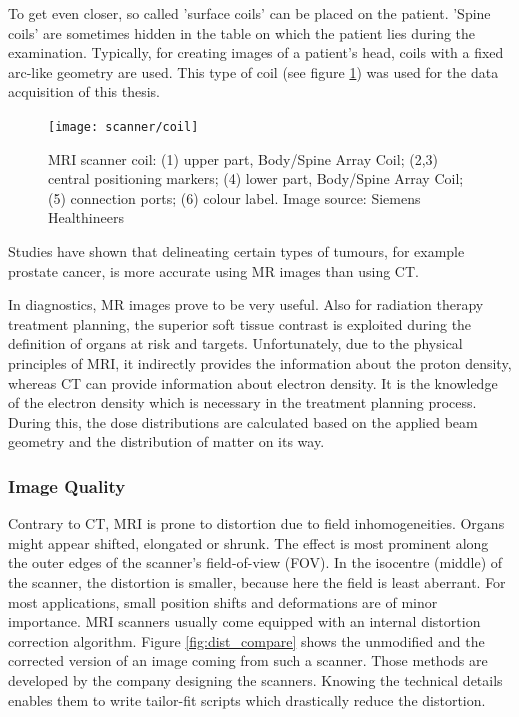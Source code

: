 To get even closer, so called 'surface coils' can be placed on the patient.
'Spine coils' are sometimes hidden in the table on which the patient lies during the examination.
Typically, for creating images of a patient's head, coils with a fixed arc-like geometry are used.
This type of coil (see figure \ref{fig:coil}) was used for the data acquisition of this thesis.

\begin{figure}[tbh!]
\centering
\texttt{[image: scanner/coil]}
\caption[MRI scanner coil. Image source: Siemens Healthineers]{MRI scanner coil: (1) upper part, Body/Spine Array Coil; (2,3) central positioning markers; (4) lower part, Body/Spine Array Coil; (5) connection ports; (6) colour label. Image source: Siemens Healthineers}
\label{fig:coil}
\end{figure}

Studies have shown that delineating certain types of tumours, for example prostate cancer, is more accurate using MR images than using CT. \cite{Rasch1999, Debois1999, Roach1996}

In diagnostics, MR images prove to be very useful.
Also for radiation therapy treatment planning, the superior soft tissue contrast is exploited during the definition of organs at risk and targets.
Unfortunately, due to the physical principles of MRI, it indirectly provides the information about the proton density, whereas CT can provide information about electron density.
It is the knowledge of the electron density which is necessary in the treatment planning process.
During this, the dose distributions are calculated based on the applied beam geometry and the distribution of matter on its way.


\subsubsection{Image Quality}
Contrary to CT, MRI is prone to distortion due to field inhomogeneities.
Organs might appear shifted, elongated or shrunk.
The effect is most prominent along the outer edges of the scanner's field-of-view (FOV).
In the isocentre (middle) of the scanner, the distortion is smaller, because here the field is least aberrant.
For most applications, small position shifts and deformations are of minor importance.
MRI scanners usually come equipped with an internal distortion correction algorithm.
Figure \ref{fig:dist_compare} shows the unmodified and the corrected version of an image coming from such a scanner.
Those methods are developed by the company designing the scanners.
Knowing the technical details enables them to write tailor-fit scripts which drastically reduce the distortion.

